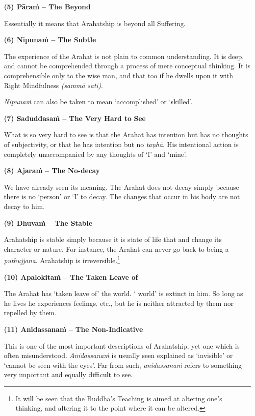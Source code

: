 \textbf{(5) Pāraṁ -- The Beyond}

\protect\hypertarget{beyond}{}{}Essentially it means that Arahatship is beyond all Suffering.

\clearpage

\textbf{(6) Nipunaṁ -- The Subtle}

The experience of the Arahat is not plain to common understanding. It is deep, and cannot be comprehended through a process of mere conceptual thinking. It is comprehensible only to the wise man, and that too if he dwells upon it with Right Mindfulness \emph{(sammā sati)}.

\emph{Nipunaṁ} can also be taken to mean `accomplished' or `skilled'.

\textbf{(7) Saduddasaṁ -- The Very Hard to See}

What is so very hard to see is that the Arahat has intention but has no thoughts of subjectivity, or that he has intention but no \emph{taṇhā}. His intentional action is completely unaccompanied by any thoughts of `I' and `mine'.

\textbf{(8) Ajaraṁ -- The No-decay}

We have already seen its meaning. The Arahat does not decay simply because there is no `person' or `I' to decay. The changes that occur in his body are not decay to him.

\textbf{(9) Dhuvaṁ -- The Stable}

Arahatship is  stable simply because it is  state of life that  and  change its character or nature. For instance, the Arahat can never go back to being a \emph{puthujjana}. Arahatship is irreversible.\footnote{It will be seen that the Buddha's Teaching is aimed at altering one's thinking, and altering it to the point where it can  be altered.}

\clearpage

\textbf{(10) Apalokitaṁ -- The Taken Leave of}

The Arahat has `taken leave of' the world. ` world' is extinct in him. So long as he lives he experiences feelings, etc., but he is neither attracted by them nor repelled by them.

\textbf{(11) Anidassanaṁ -- The Non-Indicative}

This is one of the most important descriptions of Arahatship, yet one which is often misunderstood. \emph{Anidassanaṁ} is usually seen explained as `invisible' or `cannot be seen with the eyes'. Far from such, \emph{anidassanaṁ} refers to something very important and equally difficult to see.

